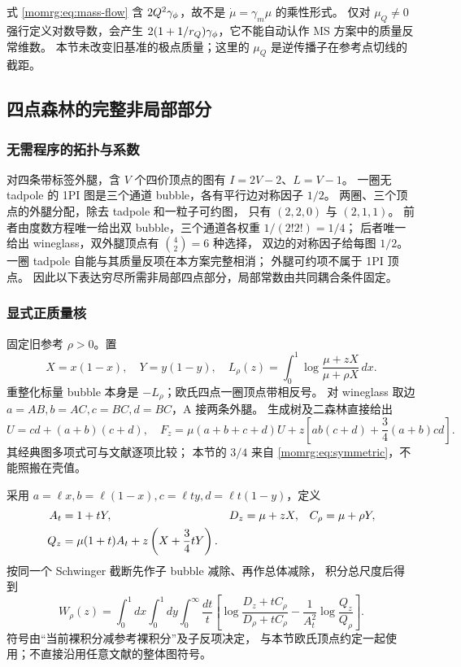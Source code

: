 \documentclass[11pt,a4paper,oneside]{ctexart}
\theoremstyle{cnplain}
\theoremstyle{definition}
\theoremstyle{remark}
\numberwithin{equation}{section}
\begin{document}
式 \eqref{momrg:eq:mass-flow} 含 $2Q^2\gamma_\phi$，故不是
$\dot\mu=\gamma_m\mu$ 的乘性形式。
仅对 $\mu_Q\ne0$ 强行定义对数导数，会产生
$2(1+1/r_Q)\gamma_\phi$，它不能自动认作 MS 方案中的质量反常维数。
本节未改变旧基准的极点质量；这里的 $\mu_Q$ 是逆传播子在参考点切线的截距。


\subsection{四点森林的完整非局部部分}\label{momrg:sec:forests}
\subsubsection{无需程序的拓扑与系数}
对四条带标签外腿，含 $V$ 个四价顶点的图有
$I=2V-2$、$L=V-1$。
一圈无 tadpole 的 1PI 图是三个通道 bubble，各有平行边对称因子 $1/2$。
两圈、三个顶点的外腿分配，除去 tadpole 和一粒子可约图，
只有 $(2,2,0)$ 与 $(2,1,1)$。
前者由度数方程唯一给出双 bubble，三个通道各权重 $1/(2!2!)=1/4$；
后者唯一给出 wineglass，双外腿顶点有 $\binom42=6$ 种选择，
双边的对称因子给每图 $1/2$。
一圈 tadpole 自能与其质量反项在本方案完整相消；
外腿可约项不属于 1PI 顶点。
因此以下表达穷尽所需非局部四点部分，局部常数由共同耦合条件固定。

\subsubsection{显式正质量核}
固定旧参考 $\rho>0$。置
\begin{equation}\label{momrg:eq:one-loop}
 X=x(1-x),\quad Y=y(1-y),\quad
 L_\rho(z)=\int_0^1\log\frac{\mu+zX}{\mu+\rho X}\,dx.
\end{equation}
重整化标量 bubble 本身是 $-L_\rho$；欧氏四点一圈顶点带相反号。
对 wineglass 取边 $a=AB,b=AC,c=BC,d=BC$，A 接两条外腿。
生成树及二森林直接给出
\begin{equation}\label{momrg:eq:wine-polynomial}
 U=cd+(a+b)(c+d),\quad
 F_z=\mu(a+b+c+d)U
       +z\left[ab(c+d)+\frac34(a+b)cd\right].
\end{equation}
其经典图多项式可与文献\cite[第5节]{bk2012}逐项比较；
本节的 $3/4$ 来自 \eqref{momrg:eq:symmetric}，不能照搬在壳值。

采用 $a=\ell x,b=\ell(1-x),c=\ell t y,d=\ell t(1-y)$，定义
\begin{align}
 A_t&=1+tY,& D_z&=\mu+zX,& C_\rho&=\mu+\rho Y, \notag\\
 Q_z&=\mu(1+t)A_t+z\left(X+\frac34tY\right).
                                                        \label{momrg:eq:Q}
\end{align}
按同一个 Schwinger 截断先作子 bubble 减除、再作总体减除，
积分总尺度后得到
\begin{equation}\label{momrg:eq:W}
 W_\rho(z)=\int_0^1dx\int_0^1dy\int_0^\infty\frac{dt}{t}
 \left[
  \log\frac{D_z+tC_\rho}{D_\rho+tC_\rho}
  -\frac1{A_t^2}\log\frac{Q_z}{Q_\rho}
 \right].
\end{equation}
符号由“当前裸积分减参考裸积分”及子反项决定，
与本节欧氏顶点约定一起使用；不直接沿用任意文献的整体图符号。
\end{document}
